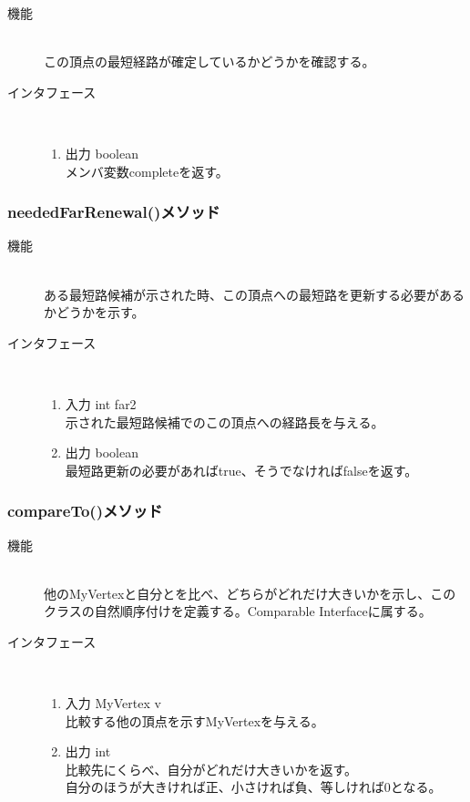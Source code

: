 \documentclass[a4j]{jarticle}
\begin{document}
\begin{description}
\begin{description}
\begin{description}
\item[機能]\mbox{}\\
この頂点の最短経路が確定しているかどうかを確認する。
\item[インタフェース]\
  \begin{enumerate}
  \item 出力 boolean\mbox{}\\
    メンバ変数completeを返す。
  \end{enumerate}
\end{description}

\subsubsection{neededFarRenewal()メソッド}

\begin{description}
\item[機能]\mbox{}\\
ある最短路候補が示された時、この頂点への最短路を更新する必要があるかどうかを示す。
\item[インタフェース]\
  \begin{enumerate}
  \item 入力 int far2\mbox{}\\
    示された最短路候補でのこの頂点への経路長を与える。
  \item 出力 boolean~\\
    最短路更新の必要があればtrue、そうでなければfalseを返す。
  \end{enumerate}
\end{description}

\subsubsection{compareTo()メソッド}

\begin{description}
\item[機能]\mbox{}\\
他のMyVertexと自分とを比べ、どちらがどれだけ大きいかを示し、このクラスの自然順序付けを定義する。Comparable Interfaceに属する。
\item[インタフェース]\
  \begin{enumerate}
  \item 入力 MyVertex v\mbox{}\\
    比較する他の頂点を示すMyVertexを与える。
  \item 出力 int ~\\
    比較先にくらべ、自分がどれだけ大きいかを返す。\\
    自分のほうが大きければ正、小さければ負、等しければ0となる。
  \end{enumerate}
\end{description}


\end{description}
\end{description}
\end{document}
